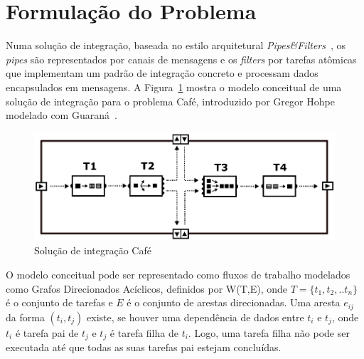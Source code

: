 \section{Formula\c{c}\~{a}o do Problema}
\label{sec:formulacao_problema}
Numa solução de integração, baseada no estilo arquitetural \emph{Pipes\&Filters}~\cite{alexander1977}, os \textit{pipes} são representados por canais de mensagens e os \textit{filters} por tarefas atômicas que implementam um padrão de integração concreto e processam dados encapsulados em mensagens.
A Figura~\ref{fig:sample-cafe} mostra o modelo conceitual de uma solução de integração para o problema Café, introduzido por Gregor Hohpe~\cite{hohpe2005} modelado com Guaraná~\cite{frantz2016}.
\begin{figure}[htb]
	\centering
	\includegraphics[scale=0.25]{./figs/cafe-guarana.png}
	\caption{Solução de integração Café}
	\label{fig:sample-cafe}
\end{figure}
O modelo conceitual pode ser representado como fluxos de trabalho modelados como Grafos Direcionados Acíclicos, definidos por W(T,E), onde $T = \{t_1,t_2,..t_n\}$ é o conjunto de tarefas e $E$ é o conjunto de arestas direcionadas. Uma aresta $e_{ij}$ da forma $({t_i},{t_j})$ existe, se houver uma dependência de dados entre $t_i$ e $t_j$, onde $t_i$ é tarefa pai de $t_j$ e $t_j$ é tarefa filha de $t_i$. Logo, uma tarefa filha não pode ser executada até que todas as suas tarefas pai estejam concluídas. 
